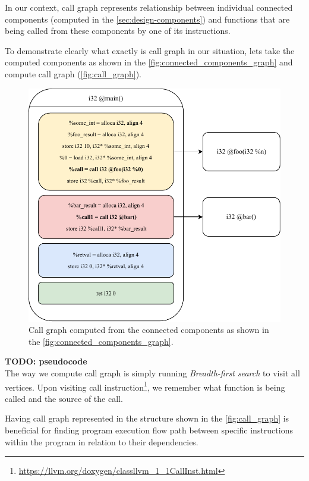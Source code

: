 \documentclass[12pt, twoside]{fithesis2}
\renewcommand{\_}{\leavevmode \kern0.07em\vbox{\hrule width0.4em}}
\begin{document}
In our context, call graph represents relationship between individual
connected components (computed in the \autoref{sec:design-components})
and functions that are being called from these components by one of its
instructions.

To demonstrate clearly what exactly is call graph in our situation, lets take
the computed components as shown in the \autoref{fig:connected_components_graph}
and compute call graph (\autoref{fig:call_graph}).

\begin{figure}[ht]
    \centering
    \includegraphics[]{images/main_callgraph.pdf}
    \caption{Call graph computed from the connected components
    as shown in the \autoref{fig:connected_components_graph}.}
    \label{fig:call_graph}
\end{figure}

\textbf{TODO: pseudocode}\\
The way we compute call graph is simply running \emph{Breadth-first search}
to visit all vertices.
Upon visiting call instruction\footnote{\url{https://llvm.org/doxygen/classllvm_1_1CallInst.html}},
we remember what function is being called and the source of the call.

Having call graph represented in the structure shown in the
\autoref{fig:call_graph}
is beneficial for finding
program execution flow path between specific instructions within the program in
relation to their dependencies.
\end{document}
